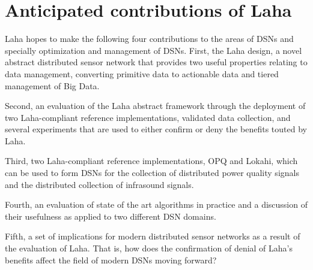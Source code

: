 \section{Anticipated contributions of Laha}
Laha hopes to make the following four contributions to the areas of DSNs and specially optimization and management of DSNs.  First, the Laha design, a novel abstract distributed sensor network that provides two useful properties relating to data management, converting primitive data to actionable data and tiered management of Big Data.

Second, an evaluation of the Laha abstract framework through the deployment of two Laha-compliant reference implementations, validated data collection, and several experiments that are used to either confirm or deny the benefits touted by Laha. 

Third, two Laha-compliant reference implementations, OPQ and Lokahi, which can be used to form DSNs for the collection of distributed power quality signals and the distributed collection of infrasound signals.

Fourth, an evaluation of state of the art algorithms in practice and a discussion of their usefulness as applied to two different DSN domains.

Fifth, a set of implications for modern distributed sensor networks as a result of the evaluation of Laha. That is, how does the confirmation of denial of Laha's benefits affect the field of modern DSNs moving forward?





